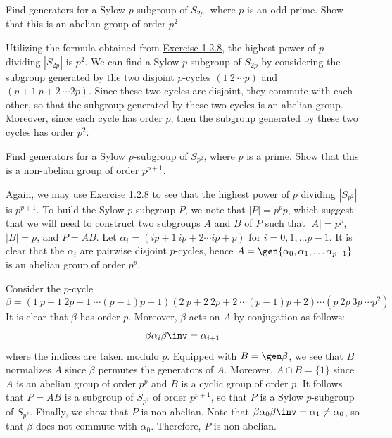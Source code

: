 \begin{exercise}\label{ex4.5.45}
	Find generators for a Sylow $p$-subgroup of $S_{2p}$, where $p$ is an odd prime. Show that this is an abelian group of order $p^2$.
\end{exercise}

\begin{sol}
	Utilizing the formula obtained from \hyperref[ex1.2.8]{Exercise 1.2.8}, the highest power of $p$ dividing $|S_{2p}|$ is $p^2$. We can find a Sylow $p$-subgroup of $S_{2p}$ by considering the subgroup generated by the two disjoint $p$-cycles $(1\ 2\ \cdots p)$ and $(p + 1\ p + 2\ \cdots 2p)$. Since these two cycles are disjoint, they commute with each other, so that the subgroup generated by these two cycles is an abelian group. Moreover, since each cycle has order $p$, then the subgroup generated by these two cycles has order $p^2$.
\end{sol}

\begin{exercise}\label{ex4.5.46}
	Find generators for a Sylow $p$-subgroup of $S_{p^2}$, where $p$ is a prime. Show that this is a non-abelian group of order $p^{p + 1}$.
\end{exercise}

\begin{sol}
	Again, we may use \hyperref[ex1.2.8]{Exercise 1.2.8} to see that the highest power of $p$ dividing $|S_{p^2}|$ is $p^{p + 1}$. To build the Sylow $p$-subgroup $P$, we note that $|P| = p^p p$, which suggest that we will need to construct two subgroups $A$ and $B$ of $P$ such that $|A| = p^p$, $|B| = p$, and $P = AB$. Let $\alpha_i = (ip + 1\ ip + 2 \cdots ip + p)$ for $i = 0, 1, \ldots p - 1$. It is clear that the $\alpha_i$ are pairwise disjoint $p$-cycles, hence $A = \gen{\alpha_0, \alpha_1, \ldots \alpha_{p - 1}}$ is an abelian group of order $p^p$.

	Consider the $p$-cycle
	\[\beta = (1\ p + 1\ 2p + 1\ \cdots (p - 1)p + 1)(2\ p + 2\ 2p + 2\ \cdots (p - 1)p + 2) \cdots (p\ 2p\ 3p\ \cdots p^2)\]
	It is clear that $\beta$ has order $p$. Moreover, $\beta$ acts on $A$ by conjugation as follows:
	\[\beta \alpha_i \beta\inv = \alpha_{i + 1}\]
	where the indices are taken modulo $p$. Equipped with $B = \gen\beta$, we see that $B$ normalizes $A$ since $\beta$ permutes the generators of $A$. Moreover, $A \cap B = \{1\}$ since $A$ is an abelian group of order $p^p$ and $B$ is a cyclic group of order $p$. It follows that $P = AB$ is a subgroup of $S_{p^2}$ of order $p^{p + 1}$, so that $P$ is a Sylow $p$-subgroup of $S_{p^2}$. Finally, we show that $P$ is non-abelian. Note that $\beta \alpha_0 \beta\inv = \alpha_1 \neq \alpha_0$, so that $\beta$ does not commute with $\alpha_0$. Therefore, $P$ is non-abelian.
\end{sol}

